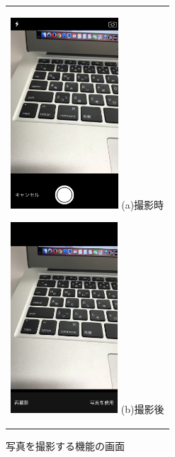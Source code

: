 \begin{figure}[htbp]
  \begin{center}
    \begin{tabular}{c}

      \begin{minipage}{0.33\hsize}
        \begin{center}
\includegraphics[width=4cm, bb=0 0 304 570]{kiko_takephoto1.PNG}
          \hspace{1cm} (a)撮影時
        \end{center}
      \end{minipage}

      \begin{minipage}{0.33\hsize}
        \begin{center}
\includegraphics[width=4cm, bb=0 0 304 570]{kiko_takephoto2.PNG}
          \hspace{1cm} (b)撮影後
        \end{center}
      \end{minipage}
      
    \end{tabular}
    \caption{写真を撮影する機能の画面}
    \label{fig:lena}
  \end{center}
\end{figure}　　　　　　　　　　

